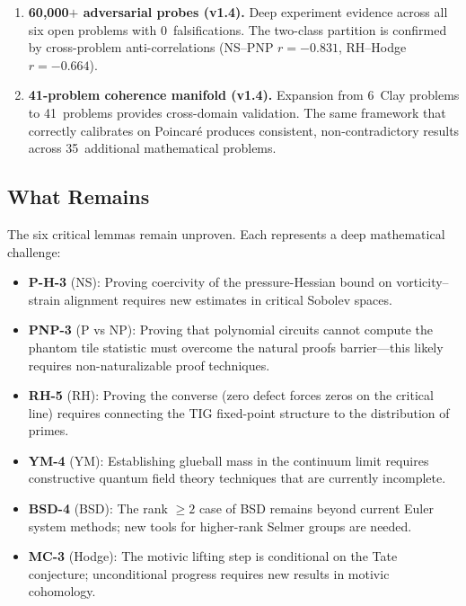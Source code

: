 \documentclass[11pt]{article}
\begin{document}
\begin{enumerate}
\item \textbf{60,000$+$ adversarial probes (v1.4).}  Deep experiment
evidence across all six open problems with 0~falsifications.  The
two-class partition is confirmed by cross-problem anti-correlations
(NS--PNP $r = -0.831$, RH--Hodge $r = -0.664$).

\item \textbf{41-problem coherence manifold (v1.4).}  Expansion from
6~Clay problems to 41~problems provides cross-domain validation.
The same framework that correctly calibrates on Poincar\'e produces
consistent, non-contradictory results across 35~additional mathematical
problems.
\end{enumerate}

\subsection{What Remains}
\label{subsec:remains}

The six critical lemmas remain unproven.  Each represents a deep
mathematical challenge:

\begin{itemize}
\item \textbf{P-H-3} (NS): Proving coercivity of the pressure-Hessian
bound on vorticity--strain alignment requires new estimates in
critical Sobolev spaces.

\item \textbf{PNP-3} (P vs NP): Proving that polynomial circuits
cannot compute the phantom tile statistic must overcome the natural
proofs barrier---this likely requires non-naturalizable proof
techniques.

\item \textbf{RH-5} (RH): Proving the converse (zero defect forces
zeros on the critical line) requires connecting the TIG fixed-point
structure to the distribution of primes.

\item \textbf{YM-4} (YM): Establishing glueball mass in the continuum
limit requires constructive quantum field theory techniques that
are currently incomplete.

\item \textbf{BSD-4} (BSD): The rank $\geq 2$ case of BSD remains
beyond current Euler system methods; new tools for higher-rank
Selmer groups are needed.

\item \textbf{MC-3} (Hodge): The motivic lifting step is conditional
on the Tate conjecture; unconditional progress requires new results
in motivic cohomology.
\end{itemize}
\end{document}
